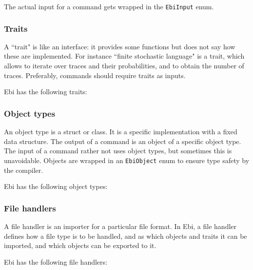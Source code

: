 \documentclass{article}
\begin{document}
            The actual input for a command gets wrapped in the \texttt{EbiInput} enum.
    
        \subsubsection{Traits}
        \label{sec:traits}
            A ``trait" is like an interface: it provides some functions but does not say how these are implemented.
            For instance ``finite stochastic language" is a trait, which allows to iterate over traces and their probabilities, and to obtain the number of traces.
            Preferably, commands should require traits as inputs.

            Ebi has the following traits:
            \ebitraitlist
    
        \subsubsection{Object types}
        \label{sec:objecttypes}
            An object type is a struct or class.
            It is a specific implementation with a fixed data structure.
            The output of a command is an object of a specific object type.
            The input of a command rather not uses object types, but sometimes this is unavoidable.
            Objects are wrapped in an \texttt{EbiObject} enum to ensure type safety by the compiler.

            Ebi has the following object types:
            \ebiobjecttypelist
    
        \subsubsection{File handlers}
            A file handler is an importer for a particular file format.
            In Ebi, a file handler defines how a file type is to be handled, and as which objects and traits it can be imported, and which objects can be exported to it.
    
            Ebi has the following file handlers:
            \ebifilehandlerlist
            
\end{document}
